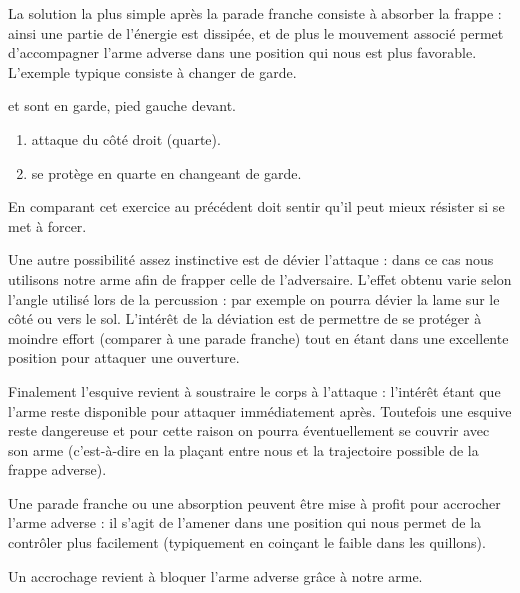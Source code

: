 La solution la plus simple après la parade franche consiste à absorber la frappe : ainsi une partie de l'énergie est dissipée, et de plus le mouvement associé permet d'accompagner l'arme adverse dans une position qui nous est plus favorable.
L'exemple typique consiste à changer de garde.


\begin{exercice}

\A et \D sont en garde, pied gauche devant.

\begin{enumerate}
	\item \A attaque \D du côté droit (quarte).
	
	\item \D se protège en quarte en changeant de garde.
\end{enumerate}

En comparant cet exercice au précédent \D doit sentir qu'il peut mieux résister si \A se met à forcer.
\end{exercice}


Une autre possibilité assez instinctive est de dévier l'attaque : dans ce cas nous utilisons notre arme afin de frapper celle de l'adversaire.
L'effet obtenu varie selon l'angle utilisé lors de la percussion : par exemple on pourra dévier la lame sur le côté ou vers le sol.
L'intérêt de la déviation est de permettre de se protéger à moindre effort (comparer à une parade franche) tout en étant dans une excellente position pour attaquer une ouverture.


Finalement l'esquive revient à soustraire le corps à l'attaque : l'intérêt étant que l'arme reste disponible pour attaquer immédiatement après.
Toutefois une esquive reste dangereuse et pour cette raison on pourra éventuellement se couvrir avec son arme (c'est-à-dire en la plaçant entre nous et la trajectoire possible de la frappe adverse).


Une parade franche ou une absorption peuvent être mise à profit pour accrocher l'arme adverse : il s'agit de l'amener dans une position qui nous permet de la contrôler plus facilement (typiquement en coinçant le faible dans les quillons).


\begin{definition}[Accrochage]

Un accrochage revient à bloquer l'arme adverse grâce à notre arme.
\end{definition}


